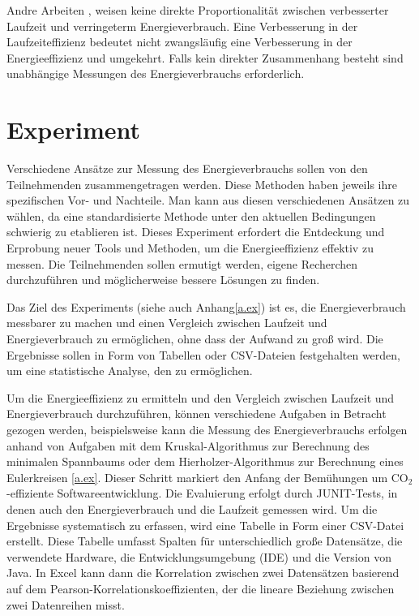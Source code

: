 \documentclass{article}
\begin{document}
Andre Arbeiten  \cite{trefethen_energy-aware_2013,lima_haskell_2016}, weisen keine direkte Proportionalität zwischen verbesserter Laufzeit und verringeterm  Energieverbrauch. Eine Verbesserung in der Laufzeiteffizienz bedeutet nicht zwangsläufig eine Verbesserung in der Energieeffizienz und umgekehrt.
Falls kein direkter Zusammenhang besteht sind  unabhängige  Messungen  des Energieverbrauchs erforderlich. 




\section{Experiment}

Verschiedene Ansätze zur Messung des Energieverbrauchs sollen von den Teilnehmenden zusammengetragen werden. Diese Methoden haben jeweils ihre spezifischen Vor- und Nachteile. Man  kann aus diesen verschiedenen Ansätzen zu wählen, da eine standardisierte Methode unter den aktuellen Bedingungen schwierig zu etablieren ist. 
Dieses Experiment erfordert die Entdeckung und Erprobung neuer Tools und Methoden, um die Energieeffizienz effektiv zu messen. Die Teilnehmenden sollen ermutigt werden, eigene Recherchen durchzuführen und möglicherweise bessere Lösungen zu finden. 

Das Ziel des Experiments (siehe auch  Anhang\ref{a.ex}) ist es, die Energieverbrauch messbarer zu machen und einen Vergleich zwischen Laufzeit und Energieverbrauch  zu ermöglichen, ohne dass der Aufwand zu groß wird. 
Die Ergebnisse sollen in Form von Tabellen oder CSV-Dateien festgehalten werden, um eine  statistische Analyse, den zu ermöglichen.

Um die Energieeffizienz zu ermitteln und den Vergleich zwischen Laufzeit und Energieverbrauch durchzuführen, können  verschiedene Aufgaben in Betracht gezogen werden, beispielsweise kann die Messung  des Energieverbrauchs erfolgen anhand von Aufgaben mit dem  Kruskal-Algorithmus zur Berechnung des minimalen Spannbaums oder dem Hierholzer-Algorithmus zur Berechnung eines  Eulerkreisen \ref{a.ex}.
Dieser Schritt markiert den Anfang der Bemühungen um CO$_2$-effiziente Softwareentwicklung. Die Evaluierung erfolgt durch JUNIT-Tests, in denen auch den Energieverbrauch und die Laufzeit gemessen wird.
Um die Ergebnisse systematisch zu erfassen, wird eine Tabelle in Form einer CSV-Datei erstellt. Diese Tabelle umfasst Spalten für unterschiedlich große Datensätze, die verwendete Hardware, die Entwicklungsumgebung  (IDE) und die Version von Java. 
In Excel kann dann die Korrelation zwischen zwei Datensätzen basierend auf dem Pearson-Korrelationskoeffizienten, der die lineare Beziehung zwischen zwei Datenreihen misst. 
\end{document}
